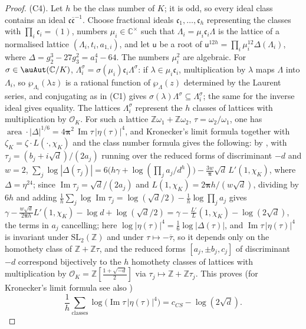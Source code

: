 \documentclass[10pt]{amsart}
\theoremstyle{definition}
\theoremstyle{remark}
\newcommand{\C}{\mathbb C}
\newcommand{\Z}{\mathbb Z}
\newcommand{\Iml}{\operatorname{Im}}
\providecommand{\auO}{\mathcal O}
\providecommand{\aubar}[1]{\overline{#1}}
\begin{document}
\begin{proof}
(C4). Let $h$ be the class number of $K$; it is odd, so every ideal class contains an ideal
$\mathfrak c\aubar{\mathfrak c}^{-1}$. Choose fractional ideals $\mathfrak c_1,\dots,\mathfrak c_h$
representing the classes with $\prod_i\mathfrak c_i=(1)$, numbers $\mu_i\in\C^\times$ such that
$\Lambda_i=\mu_i\mathfrak c_i\Lambda$ is the lattice of a normalised lattice $(\Lambda_i,t_i,a_{1,i})$,
and let $\mathsf u$ be a root of $\mathsf u^{12h}=\prod_i\mu_i^{12}\Delta(\Lambda_i)$, where
$\Delta=g_2^3-27g_3^2=a_1^4-64$. The numbers $\mu_i^2$ are algebraic. For $\sigma\in\auAut(\C/K)$,
$\Lambda_i^\sigma=\sigma(\mu_i)\mathfrak c_i\Lambda^\sigma$: if $\lambda\in\mu_i\mathfrak c_i$,
multiplication by $\lambda$ maps $\Lambda$ into $\Lambda_i$, so $\wp_{\Lambda_i}(\lambda z)$ is a
rational function of $\wp_\Lambda(z)$ determined by the Laurent series, and conjugating as in
(C1) gives $\sigma(\lambda)\Lambda^\sigma\subseteq\Lambda_i^\sigma$; the same for the inverse
ideal gives equality. The lattices $\Lambda_i^\sigma$ represent the $h$ classes of lattices with
multiplication by $\auO_K$. For such a lattice $\Z\omega_1+\Z\omega_2$, $\tau=\omega_2/\omega_1$,
one has $\operatorname{area}\cdot|\Delta|^{1/6}=4\boldsymbol\pi^2\,\Iml\tau\,|\eta(\tau)|^4$, and
Kronecker's limit formula together with $\zeta_K=\zeta\cdot L(\cdot,\chi_K)$ and the class number
formula gives the following: by \cite[\S12, the display preceding~(2)]{ChowlaSelberg}, with
$\tau_j=(b_j+i\sqrt d)/(2a_j)$ running over the reduced forms of discriminant $-d$ and $w=2$,
$\sum_j\log|\Delta(\tau_j)|=6\bigl(h\gamma+\log(\prod_ja_j/d^h)\bigr)-\frac{3w}{\boldsymbol\pi}\sqrt d\,
L'(1,\chi_K)$, where $\Delta=\eta^{24}$; since $\Iml\tau_j=\sqrt d/(2a_j)$ and
$L(1,\chi_K)=2\boldsymbol\pi h/(w\sqrt d)$, dividing by $6h$ and adding
$\frac1h\sum_j\log\Iml\tau_j=\log(\sqrt d/2)-\frac1h\log\prod_ja_j$ gives $\gamma-\frac{w\sqrt d}{2\boldsymbol\pi h}L'(1,\chi_K)-\log d+\log(\sqrt d/2)=\gamma-\frac{L'}{L}(1,\chi_K)-\log(2\sqrt d)$, the terms in $a_j$ cancelling; here $\log|\eta(\tau)|^4=\frac16\log|\Delta(\tau)|$, and $\Iml\tau\,|\eta(\tau)|^4$ is invariant under $\mathrm{SL}_2(\Z)$ and under $\tau\mapsto-\aubar\tau$, so it depends only on the homothety class of $\Z+\Z\tau$, and the reduced forms $[a_j,\pm b_j,c_j]$ of discriminant $-d$ correspond bijectively to the $h$ homothety classes of lattices with multiplication by $\auO_K=\Z[\frac{1+\sqrt{-d}}2]$ via $\tau_j\mapsto\Z+\Z\tau_j$. This proves (for Kronecker's limit formula see also
\cite[Chapter~20, \S4]{LangEF})
\[
\frac1h\sum_{\text{classes}}\log\bigl(\Iml\tau\,|\eta(\tau)|^4\bigr)=c_{CS}-\log(2\sqrt d).
\]
\end{proof}
\end{document}
